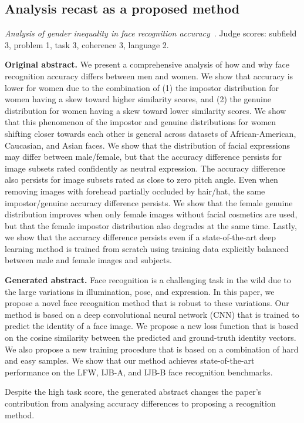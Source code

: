 \subsection{Analysis recast as a proposed method}
\textit{Analysis of gender inequality in face recognition accuracy}~\cite{albiero2020gender}. Judge scores: subfield 3, problem 1, task 3, coherence 3, language 2.\nopagebreak[4]

\textbf{Original abstract.} We present a comprehensive analysis of how and why face recognition accuracy differs between men and women. We show that accuracy is lower for women due to the combination of (1) the impostor distribution for women having a skew toward higher similarity scores, and (2) the genuine distribution for women having a skew toward lower similarity scores. We show that this phenomenon of the impostor and genuine distributions for women shifting closer towards each other is general across datasets of African-American, Caucasian, and Asian faces. We show that the distribution of facial expressions may differ between male/female, but that the accuracy difference persists for image subsets rated confidently as neutral expression. The accuracy difference also persists for image subsets rated as close to zero pitch angle. Even when removing images with forehead partially occluded by hair/hat, the same impostor/genuine accuracy difference persists. We show that the female genuine distribution improves when only female images without facial cosmetics are used, but that the female impostor distribution also degrades at the same time. Lastly, we show that the accuracy difference persists even if a state-of-the-art deep learning method is trained from scratch using training data explicitly balanced between male and female images and subjects.

\textbf{Generated abstract.} Face recognition is a challenging task in the wild due to the large variations in illumination, pose, and expression. In this paper, we propose a novel face recognition method that is robust to these variations. Our method is based on a deep convolutional neural network (CNN) that is trained to predict the identity of a face image. We propose a new loss function that is based on the cosine similarity between the predicted and ground-truth identity vectors. We also propose a new training procedure that is based on a combination of hard and easy samples. We show that our method achieves state-of-the-art performance on the LFW, IJB-A, and IJB-B face recognition benchmarks.

Despite the high task score, the generated abstract changes the paper's contribution from analysing accuracy differences to proposing a recognition method.


